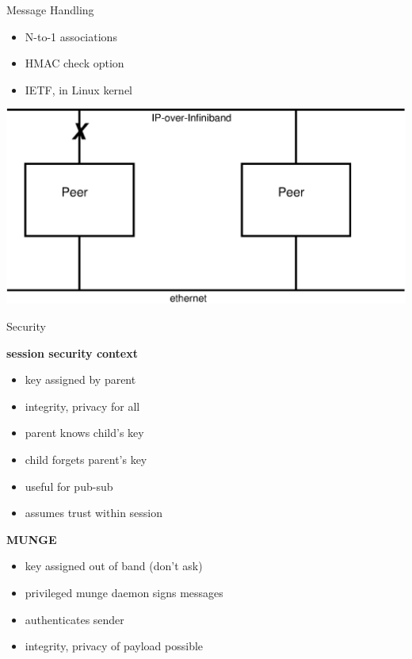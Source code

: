 \documentclass[default,pdf,colorBG,slideColor]{prosper}
\begin{document}
\begin{slide}{Message Handling}
{\begin{minipage}{0.45\textwidth}
\begin{itemize}
    \item{N-to-1 associations}
    \item{HMAC check option}
    \item{IETF, in Linux kernel}
  \end{itemize}
  \begin{center}
  \includegraphics[scale=0.10]{comms_sctp}
  \end{center}
  \end{minipage}
  \hfill
}\end{slide}
\begin{slide}{Security}{\small
  \hfill
  \begin{minipage}{0.5\textwidth}
  {\bf session security context}
  \begin{itemize}
    \item{key assigned by parent}
    \item{integrity, privacy for all}
    \item{parent knows child's key}
    \item{child forgets parent's key}
    \item{useful for pub-sub}
    \item{assumes trust within session}
  \end{itemize}
  \end{minipage}
  \hfill
  \begin{minipage}{0.45\textwidth}
  {\bf MUNGE}
  \begin{itemize}
    \item{key assigned out of band (don't ask)}
    \item{privileged munge daemon signs messages}
    \item{authenticates sender}
    \item{integrity, privacy of payload possible}
  \end{itemize}
  \end{minipage}
  \hfill
}\end{slide}
\end{document}
